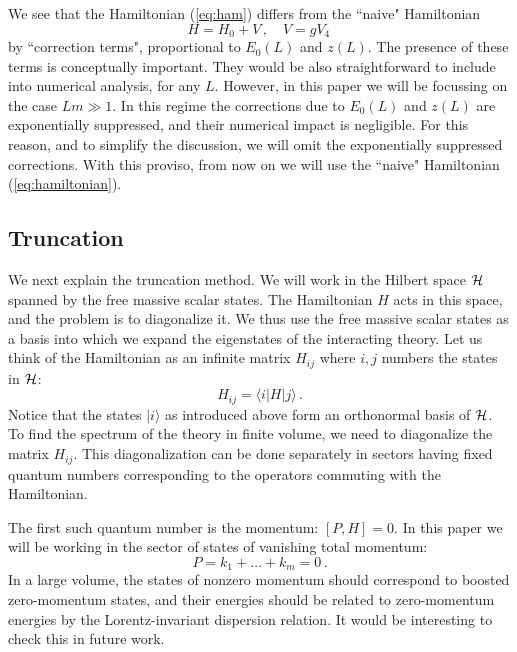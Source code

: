 \documentclass[11pt]{article}
\newcommand{\reef}[1]{(\ref{#1})}
\newcommand{\beq}{\begin{equation}}
\newcommand{\eeq}{\end{equation}}
\def\calH {{\cal H}}
\newcommand{\braket}[3]{\langle #1|#2|#3 \rangle}
\newcommand{\ket}[1]{|#1\rangle}
\numberwithin{equation}{section}
\begin{document}
We see that the Hamiltonian \reef{eq:ham} differs from the ``naive" Hamiltonian
\begin{equation}
\label{eq:hamiltonian}
H = H_0+ V\,,\quad V=g V_4 \,
\end{equation}
by ``correction terms", proportional to $E_0(L)$ and $z(L)$. The presence of these terms is conceptually important. 
They would be also straightforward to include into numerical analysis, for any $L$. However, in this paper we will be focussing on the case $L m \gg1 $. In this regime the corrections due to $E_0(L)$ and $z(L)$ are exponentially suppressed, and their numerical impact is negligible. For this reason, and to simplify the discussion, we will omit the exponentially suppressed corrections. With this proviso, from now on we will use the ``naive" Hamiltonian \reef{eq:hamiltonian}.

\subsection{Truncation}
\label{sec:probl_meth2}

We next explain the truncation method. We will work in the Hilbert space $\calH$ spanned by the free massive scalar states. The Hamiltonian $H$ acts in this space, and the problem is to diagonalize it. We thus use the free massive scalar states as a basis into which we expand the eigenstates of the interacting theory. Let us think of the Hamiltonian as an infinite matrix $H_{ij}$ where $i,j$ numbers the states in $\calH$:
\beq
H_{ij}=\braket{i}{H}{j}\,.
\eeq 
Notice that the states $\ket{i}$ as introduced above form an orthonormal basis of $\calH$. To find the spectrum of the theory in finite volume, we need to diagonalize the matrix $H_{ij}$. This diagonalization can be done separately in sectors having fixed quantum numbers corresponding to the operators commuting with the Hamiltonian.

The first such quantum number is the momentum: $[P,H]=0$. In this paper we will be working in the sector of states of vanishing total momentum: 
\beq
P=k_{1} + \dots + k_{m}=0\,.
\eeq 
In a large volume, the states of nonzero momentum should correspond to boosted zero-momentum states, and their energies should be related to zero-momentum energies by the Lorentz-invariant dispersion relation. It would be interesting to check this in future work. 
\end{document}
